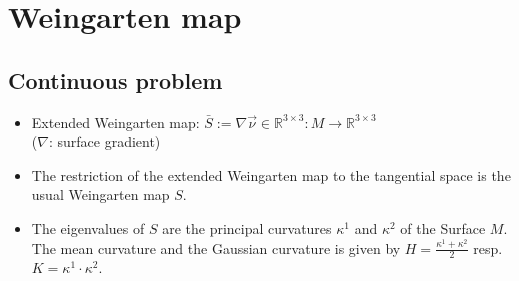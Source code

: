 \documentclass{scrartcl}
\newcommand{\R}{\mathds{R}}
\begin{document}
\pagebreak
\section*{Weingarten map}
\subsection*{Continuous problem}
\begin{itemize}
  \item Extended Weingarten map: \(\bar{S}:= \nabla\vec{\nu} \in \R^{3 \times 3}: M \rightarrow \R^{3 \times 3}\)\\
      (\( \nabla \): surface gradient)
  \item The restriction of the extended  Weingarten map to the tangential space is the usual Weingarten map \( S \).
  \item The eigenvalues of \( S \) are the principal curvatures \( \kappa^{1} \) and \( \kappa^{2} \) of the Surface \( M \).
        The mean curvature and the Gaussian curvature is given by  \(H = \frac{\kappa^{1} + \kappa^{2}}{2}  \) resp. \( K = \kappa^{1} \cdot \kappa^{2} \).
\end{itemize}
\end{document}
